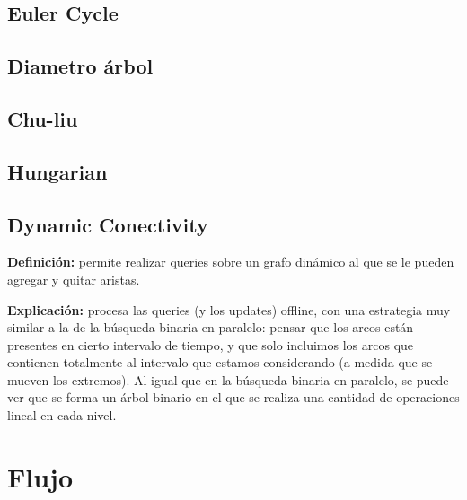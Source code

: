 {\subsection{Euler Cycle}
\subsection{Diametro árbol}
\subsection{Chu-liu}
\subsection{Hungarian}
\subsection{Dynamic Conectivity}
\textbf{Definición:} permite realizar queries sobre un grafo dinámico al que se le pueden agregar y quitar aristas.

\textbf{Explicación: } procesa las queries (y los updates) offline, con una estrategia muy similar a la de la búsqueda
binaria en paralelo: pensar que los arcos están presentes en cierto intervalo de tiempo, y que solo incluimos los arcos
que contienen totalmente al intervalo que estamos considerando (a medida que se mueven los extremos). Al igual
que en la búsqueda binaria en paralelo, se puede ver que se forma un árbol binario en el que se realiza una cantidad
de operaciones lineal en cada nivel.


\section{Flujo}%
}
